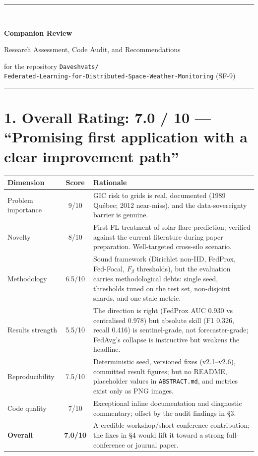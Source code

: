 \documentclass[11pt,a4paper]{article}
\newcommand{\code}[1]{\texttt{#1}}
\begin{document}
\begin{center}
    {\color{black!85}\rule{\textwidth}{0.4pt}}\\[1.6em]
    {\LARGE\bfseries Companion Review\par}
    \vspace{0.4em}
    {\large Research Assessment, Code Audit, and Recommendations\par}
    \vspace{0.8em}
    {\small for the repository \code{Daveshvats/}\\
    \code{Federated-Learning-for-Distributed-Space-Weather-Monitoring} (SF-9)\par}
    \vspace{1.0em}
    {\color{black!85}\rule{\textwidth}{0.4pt}}
\end{center}

\vspace{0.6em}

\section*{1. Overall Rating: 7.0 / 10 --- ``Promising first application with a
clear improvement path''}

\begin{table}[h]
\centering
\small
\begin{tabularx}{0.94\textwidth}{@{}l c X@{}}
\toprule
\textbf{Dimension} & \textbf{Score} & \textbf{Rationale} \\
\midrule
Problem importance & 9/10 & GIC risk to grids is real, documented
(1989 Qu\'ebec; 2012 near-miss), and the data-sovereignty barrier is
genuine. \\
Novelty & 8/10 & First FL treatment of solar flare prediction; verified
against the current literature during paper preparation. Well-targeted
cross-silo scenario. \\
Methodology & 6.5/10 & Sound framework (Dirichlet non-IID, FedProx,
Fed-Focal, $F_\beta$ thresholds), but the evaluation carries
methodological debts: single seed, thresholds tuned on the test set,
non-disjoint shards, and one stale metric. \\
Results strength & 5.5/10 & The direction is right (FedProx AUC 0.930
vs centralised 0.978) but absolute skill (F1 0.326, recall 0.416) is
sentinel-grade, not forecaster-grade; FedAvg's collapse is instructive
but weakens the headline. \\
Reproducibility & 7.5/10 & Deterministic seed, versioned fixes
(v2.1--v2.6), committed result figures; but no README, placeholder
values in \code{ABSTRACT.md}, and metrics exist only as PNG images. \\
Code quality & 7/10 & Exceptional inline documentation and diagnostic
commentary; offset by the audit findings in \S3. \\
\midrule
\textbf{Overall} & \textbf{7.0/10} & A credible workshop/short-conference
contribution; the fixes in \S4 would lift it toward a strong
full-conference or journal paper. \\
\bottomrule
\end{tabularx}
\end{table}
\end{document}
